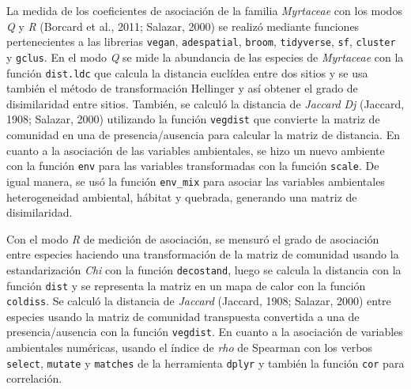 \documentclass[11pt,]{article}
\begin{document}
La medida de los coeficientes de asociación de la familia
\emph{Myrtaceae} con los modos \emph{Q} y \emph{R} (Borcard et al.,
2011; Salazar, 2000) se realizó mediante funciones pertenecientes a las
librerias \texttt{vegan}, \texttt{adespatial}, \texttt{broom},
\texttt{tidyverse}, \texttt{sf}, \texttt{cluster} y \texttt{gclus}. En
el modo \emph{Q} se mide la abundancia de las especies de
\emph{Myrtaceae} con la función \texttt{dist.ldc} que calcula la
distancia euclídea entre dos sitios y se usa también el método de
transformación Hellinger y así obtener el grado de disimilaridad entre
sitios. También, se calculó la distancia de \emph{Jaccard} \emph{Dj}
(Jaccard, 1908; Salazar, 2000) utilizando la función \texttt{vegdist}
que convierte la matriz de comunidad en una de presencia/ausencia para
calcular la matriz de distancia. En cuanto a la asociación de las
variables ambientales, se hizo un nuevo ambiente con la función
\texttt{env} para las variables transformadas con la función
\texttt{scale}. De igual manera, se usó la función \texttt{env\_mix}
para asociar las variables ambientales heterogeneidad ambiental, hábitat
y quebrada, generando una matriz de disimilaridad.

Con el modo \emph{R} de medición de asociación, se mensuró el grado de
asociación entre especies haciendo una transformación de la matriz de
comunidad usando la estandarización \emph{Chi} con la función
\texttt{decostand}, luego se calcula la distancia con la función
\texttt{dist} y se representa la matriz en un mapa de calor con la
función \texttt{coldiss}. Se calculó la distancia de \emph{Jaccard}
(Jaccard, 1908; Salazar, 2000) entre especies usando la matriz de
comunidad transpuesta convertida a una de presencia/ausencia con la
función \texttt{vegdist}. En cuanto a la asociación de variables
ambientales numéricas, usando el índice de \emph{rho} de Spearman con
los verbos \texttt{select}, \texttt{mutate} y \texttt{matches} de la
herramienta \texttt{dplyr} y también la función \texttt{cor} para
correlación.
\end{document}
